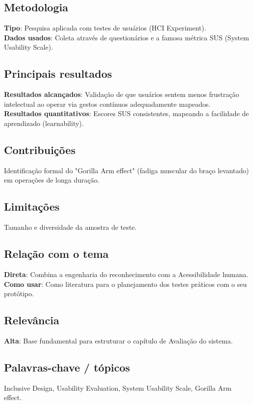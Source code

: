 \documentclass[12pt, a4paper]{article}
\begin{document}
\subsection{Metodologia}
\textbf{Tipo}: Pesquisa aplicada com testes de usuários (HCI Experiment).\\
\textbf{Dados usados}: Coleta através de questionários e a famosa métrica SUS (System Usability Scale).\\
\subsection{Principais resultados}
\textbf{Resultados alcançados}: Validação de que usuários sentem menos frustração intelectual ao operar via gestos contínuos adequadamente mapeados.\\
\textbf{Resultados quantitativos}: Escores SUS consistentes, mapeando a facilidade de aprendizado (learnability).\\
\subsection{Contribuições}
Identificação formal do "Gorilla Arm effect" (fadiga muscular do braço levantado) em operações de longa duração.\\
\subsection{Limitações}
Tamanho e diversidade da amostra de teste.\\
\subsection{Relação com o tema}
\textbf{Direta}: Combina a engenharia do reconhecimento com a Acessibilidade humana.\\
\textbf{Como usar}: Como literatura para o planejamento dos testes práticos com o seu protótipo.\\
\subsection{Relevância}
\textbf{Alta}: Base fundamental para estruturar o capítulo de Avaliação do sistema.\\
\subsection{Palavras-chave / tópicos}
Inclusive Design, Usability Evaluation, System Usability Scale, Gorilla Arm effect.\\
\end{document}
